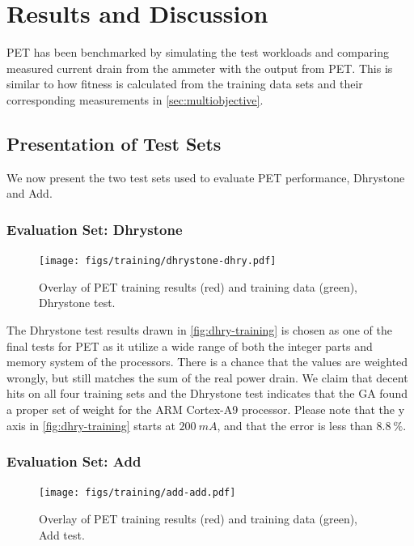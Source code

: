 \section{Results and Discussion}

PET has been benchmarked by simulating the test workloads and comparing measured
current drain from the ammeter with the output from PET. This is similar to how
fitness is calculated from the training data sets and their corresponding
measurements in \autoref{sec:multiobjective}.


\subsection{Presentation of Test Sets}

We now present the two test sets used to evaluate PET performance, Dhrystone and
Add.

\subsubsection{Evaluation Set: Dhrystone}

\begin{figure}[H]
\centering
\texttt{[image: figs/training/dhrystone-dhry.pdf]}
\caption{Overlay of PET training results (red) and training data (green),
Dhrystone test.}
\label{fig:dhry-training}
\end{figure}

The Dhrystone test results drawn in \autoref{fig:dhry-training} is chosen as one
of the final tests for PET as it utilize a wide range of both the integer parts
and memory system of the processors. There is a chance that the values are
weighted wrongly, but still matches the sum of the real power drain. We claim
that decent hits on all four training sets and the Dhrystone test indicates that
the GA found a proper set of weight for the ARM Cortex-A9 processor. Please note
that the y axis in \autoref{fig:dhry-training} starts at $200~mA$, and that the
error is less than $8.8~\%$.


\newpage

\subsubsection{Evaluation Set: Add}

\begin{figure}[ht]
\centering
\texttt{[image: figs/training/add-add.pdf]}
\caption{Overlay of PET training results (red) and training data (green), Add
test.}
\label{fig:add-training}
\end{figure}

